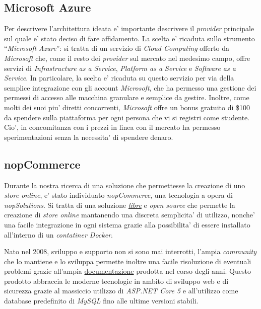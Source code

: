 \documentclass[a4paper]{report}
\newcommand{\quotes}[1]{``#1''}
\begin{document}
		\subsection{Microsoft Azure}\label{microsoft_azure}
			Per descrivere l'architettura ideata e' importante descrivere il \emph{provider} principale sul quale
			e' stato deciso di fare affidamento. La scelta e' ricaduta sullo strumento \quotes{\emph{Microsoft Azure}}:
			si tratta di un servizio di \emph{Cloud Computing} offerto da \emph{Microsoft} che, come il resto dei
			\emph{provider} sul mercato nel medesimo campo, offre servizi di \emph{Infrastructure as a Service},
			\emph{Platform as a Service} e \emph{Software as a Service}.
			In particolare, la scelta e' ricaduta su questo servizio per via della semplice integrazione con gli account
			\emph{Microsoft}, che ha permesso una gestione dei permessi di accesso alle macchina granulare e semplice da
			gestire.
			Inoltre, come molti dei suoi piu' diretti concorrenti, \emph{Microsoft} offre un bonus gratuito di \$100 da
			spendere sulla piattaforma per ogni persona che vi si registri come studente. Cio', in concomitanza con
			i prezzi in linea con il mercato ha permesso sperimentazioni senza la necessita' di spendere denaro.
		\subsection{nopCommerce}\label{nopcommerce}
			Durante la nostra ricerca di una soluzione che permettesse la creazione di uno \emph{store online}, e' stato
			individuato \emph{nopCommerce}, una tecnologia a opera di \emph{nopSolutions}. Si tratta di una soluzione
			\href{https://github.com/nopSolutions/nopCommerce/blob/develop/LICENSE.md}{\emph{libre}} e \emph{open
			source} che permette la creazione di \emph{store online} mantanendo una discreta semplicita' di utilizzo,
			nonche' una facile integrazione in ogni sistema grazie alla possibilita' di essere installato all'interno di
			un \emph{contatiner Docker}.
			
			Nato nel 2008, sviluppo e supporto non si sono mai interrotti, l'ampia \emph{community} che lo mantiene
			e lo sviluppa permette inoltre una facile risoluzione di eventuali problemi grazie all'ampia
			\href{https://docs.nopcommerce.com/en/developer/index.html?utm\_source=github&utm\_medium=referral&utm\_campaign=documentation&utm\_content=text}{documentazione}
			prodotta nel corso degli anni. Questo prodotto abbraccia le moderne tecnologie in ambito di sviluppo web e
			di sicurezza grazie al massiccio utilizzo di \emph{ASP.NET Core 5} e all'utilizzo come database predefinito
			di \emph{MySQL} fino alle ultime versioni stabili. 
\end{document}
